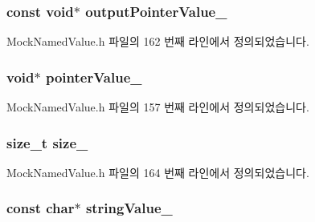 \subsubsection[{\texorpdfstring{output\+Pointer\+Value\+\_\+}{outputPointerValue_}}]{\setlength{\rightskip}{0pt plus 5cm}const void$\ast$ output\+Pointer\+Value\+\_\+}\hypertarget{class_mock_named_value_aaac935d697b2f0e695e32d2293595450}{}\label{class_mock_named_value_aaac935d697b2f0e695e32d2293595450}


Mock\+Named\+Value.\+h 파일의 162 번째 라인에서 정의되었습니다.

\subsubsection[{\texorpdfstring{pointer\+Value\+\_\+}{pointerValue_}}]{\setlength{\rightskip}{0pt plus 5cm}void$\ast$ pointer\+Value\+\_\+}\hypertarget{class_mock_named_value_a6832f12cf49d97bb10da35211fa5039a}{}\label{class_mock_named_value_a6832f12cf49d97bb10da35211fa5039a}


Mock\+Named\+Value.\+h 파일의 157 번째 라인에서 정의되었습니다.

\subsubsection[{\texorpdfstring{size\+\_\+}{size_}}]{\setlength{\rightskip}{0pt plus 5cm}size\+\_\+t size\+\_\+\hspace{0.3cm}{\ttfamily [private]}}\hypertarget{class_mock_named_value_a5f31775800bbb46b35b5791def1f3acc}{}\label{class_mock_named_value_a5f31775800bbb46b35b5791def1f3acc}


Mock\+Named\+Value.\+h 파일의 164 번째 라인에서 정의되었습니다.

\subsubsection[{\texorpdfstring{string\+Value\+\_\+}{stringValue_}}]{\setlength{\rightskip}{0pt plus 5cm}const char$\ast$ string\+Value\+\_\+}\hypertarget{class_mock_named_value_a5bc77c3f80ddeee4a5745eb1daec72dc}{}\label{class_mock_named_value_a5bc77c3f80ddeee4a5745eb1daec72dc}


